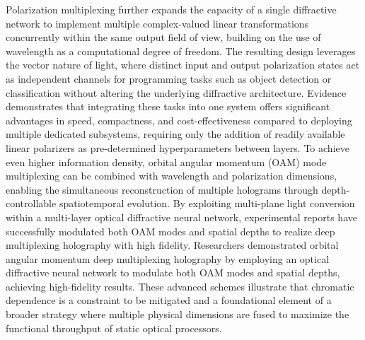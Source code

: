 \documentclass[11pt]{article}
\begin{document}
Polarization multiplexing further expands the capacity of a single diffractive network to implement multiple complex-valued linear transformations concurrently within the same output field of view, building on the use of wavelength as a computational degree of freedom. The resulting design leverages the vector nature of light, where distinct input and output polarization states act as independent channels for programming tasks such as object detection or classification without altering the underlying diffractive architecture. Evidence demonstrates that integrating these tasks into one system offers significant advantages in speed, compactness, and cost-effectiveness compared to deploying multiple dedicated subsystems, requiring only the addition of readily available linear polarizers as pre-determined hyperparameters between layers. To achieve even higher information density, orbital angular momentum (OAM) mode multiplexing can be combined with wavelength and polarization dimensions, enabling the simultaneous reconstruction of multiple holograms through depth-controllable spatiotemporal evolution. By exploiting multi-plane light conversion within a multi-layer optical diffractive neural network, experimental reports have successfully modulated both OAM modes and spatial depths to realize deep multiplexing holography with high fidelity. Researchers demonstrated orbital angular momentum deep multiplexing holography by employing an optical diffractive neural network to modulate both OAM modes and spatial depths, achieving high-fidelity results. \citep{doi_10_1364_oe_447337_61ffab71} These advanced schemes illustrate that chromatic dependence is a constraint to be mitigated and a foundational element of a broader strategy where multiple physical dimensions are fused to maximize the functional throughput of static optical processors. \citep{doi_10_1038_s41377_022_00849_x_e31226af} \citep{doi_10_1364_oe_447337_61ffab71}
\end{document}
